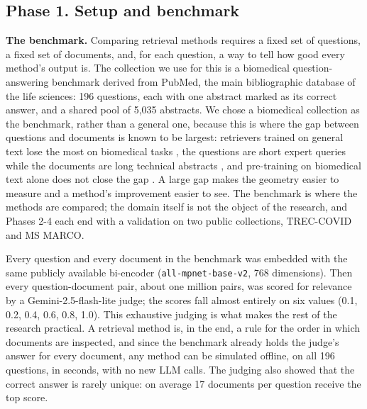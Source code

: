 \documentclass[12pt,a4paper]{article}
\begin{document}
\subsection{Phase 1. Setup and benchmark}
\label{sec:phase1}

\textbf{The benchmark.} Comparing retrieval methods requires a fixed set of questions, a fixed set of documents, and, for each question, a way to tell how good every method's output is. The collection we use for this is a biomedical question-answering benchmark derived from PubMed, the main bibliographic database of the life sciences: 196 questions, each with one abstract marked as its correct answer, and a shared pool of 5,035 abstracts. We chose a biomedical collection as the benchmark, rather than a general one, because this is where the gap between questions and documents is known to be largest: retrievers trained on general text lose the most on biomedical tasks \citep{thakur2021beir}, the questions are short expert queries while the documents are long technical abstracts \citep{tsatsaronis2015bioasq}, and pre-training on biomedical text alone does not close the gap \citep{lee2020biobert,jin2023medcpt}. A large gap makes the geometry easier to measure and a method's improvement easier to see. The benchmark is where the methods are compared; the domain itself is not the object of the research, and Phases 2-4 each end with a validation on two public collections, TREC-COVID and MS MARCO.

Every question and every document in the benchmark was embedded with the same publicly available bi-encoder (\texttt{all-mpnet-base-v2}, 768 dimensions). Then every question-document pair, about one million pairs, was scored for relevance by a Gemini-2.5-flash-lite judge; the scores fall almost entirely on six values (0.1, 0.2, 0.4, 0.6, 0.8, 1.0). This exhaustive judging is what makes the rest of the research practical. A retrieval method is, in the end, a rule for the order in which documents are inspected, and since the benchmark already holds the judge's answer for every document, any method can be simulated offline, on all 196 questions, in seconds, with no new LLM calls. The judging also showed that the correct answer is rarely unique: on average 17 documents per question receive the top score.
\end{document}
